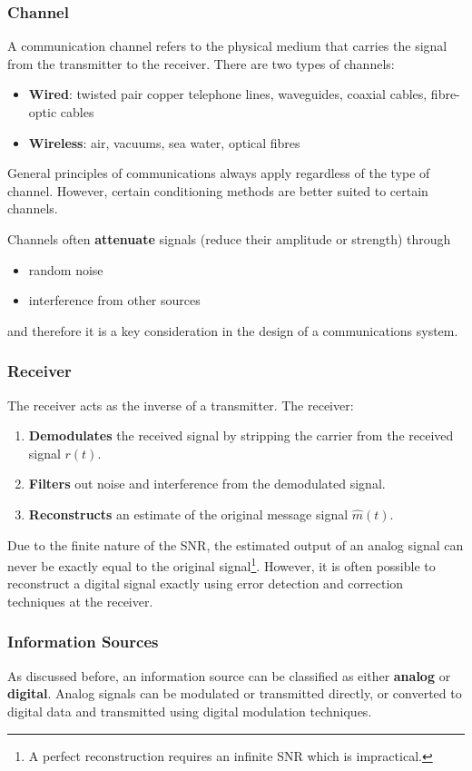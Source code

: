 \documentclass{article}
\begin{document}
\subsubsection{Channel}
A communication channel refers to the physical medium that carries the
signal from the transmitter to the receiver. There are two types of
channels:
\begin{itemize}
    \item \textbf{Wired}: twisted pair copper telephone lines,
          waveguides, coaxial cables, fibre-optic cables
    \item \textbf{Wireless}: air, vacuums, sea water, optical fibres
\end{itemize}
General principles of communications always apply regardless of the type
of channel. However, certain conditioning methods are better suited to
certain channels.

Channels often \textbf{attenuate} signals (reduce their amplitude or
strength) through
\begin{itemize}
    \item random noise
    \item interference from other sources
\end{itemize}
and therefore it is a key consideration in the design of a communications system.
\subsubsection{Receiver}
The receiver acts as the inverse of a transmitter. The receiver:
\begin{enumerate}
    \item \textbf{Demodulates} the received signal by stripping the
          carrier from the received signal \(r\left( t \right)\).
    \item \textbf{Filters} out noise and interference from the
          demodulated signal.
    \item \textbf{Reconstructs} an estimate of the original message
          signal \(\hat{m}\left( t \right)\).
\end{enumerate}
Due to the finite nature of the SNR, the estimated output of an analog
signal can never be exactly equal to the original signal\footnote{A
    perfect reconstruction requires an infinite SNR which is impractical.}.
However, it is often possible to reconstruct a digital signal exactly
using error detection and correction techniques at the receiver.
\subsubsection{Information Sources}
As discussed before, an information source can be classified as either
\textbf{analog} or \textbf{digital}. Analog signals can be modulated or
transmitted directly, or converted to digital data and transmitted
using digital modulation techniques.
\end{document}
